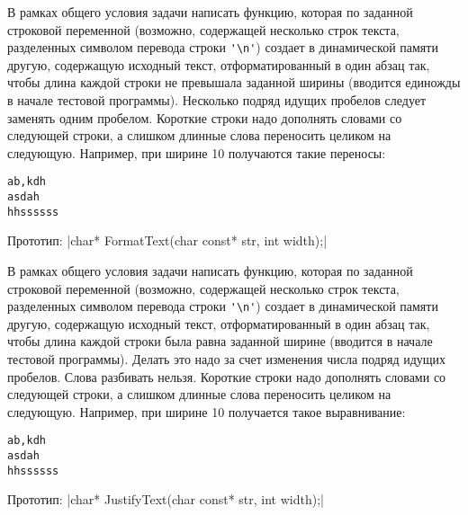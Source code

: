 \begin{zztask}
В рамках общего условия задачи написать функцию, которая по заданной строковой
переменной (возможно, содержащей несколько строк текста, разделенных символом
перевода строки \verb|'\n'|) создает в динамической памяти другую, содержащую
исходный текст, отформатированный в один абзац так, чтобы длина каждой
строки не превышала заданной ширины (вводится единожды в начале тестовой программы).
Несколько подряд идущих пробелов следует заменять одним пробелом.
Короткие строки надо дополнять словами со следующей строки, а слишком
длинные слова переносить целиком на следующую.
Например, при ширине 10 получаются такие переносы:
%
\begin{alltt}
ab, k dh
asd ah 
hhss ssss
\end{alltt}
%
Прототип:
|char* FormatText(char const* str, int width);|
\end{zztask}

\begin{zztask}
В рамках общего условия задачи написать функцию, которая по заданной строковой
переменной (возможно, содержащей несколько строк текста, разделенных символом
перевода строки \verb|'\n'|) создает в динамической памяти другую, содержащую
исходный текст, отформатированный в один абзац так, чтобы длина каждой
строки была равна заданной ширине (вводится в начале тестовой программы).
Делать это надо за счет изменения числа подряд идущих пробелов. Слова
разбивать нельзя. Короткие строки надо дополнять словами со следующей
строки, а слишком длинные слова переносить целиком на следующую.
Например, при ширине 10 получается такое выравнивание:
%
\begin{alltt}
ab,  k  dh
asd     ah 
hhss  ssss
\end{alltt}
%
Прототип: 
|char* JustifyText(char const* str, int width);|
\end{zztask}
